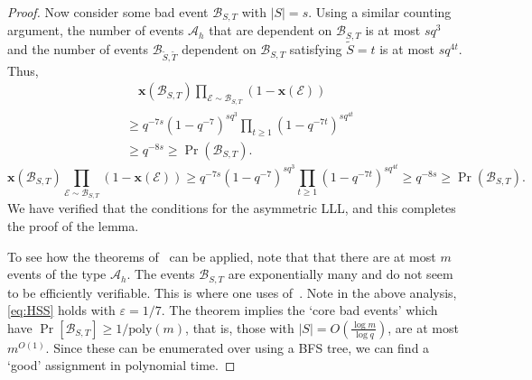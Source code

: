 \documentclass[11pt]{article}
\newcommand{\cardinal}[1]{\left|#1\right|}
\newcommand{\calA}{{\mathscr A}}
\newcommand{\calB}{{\mathscr B}}
\newcommand{\cA}{{\mathscr A}}
\newcommand{\cB}{\mathscr{B}}
\newcommand{\cE}{{\mathscr E}}
\newcommand{\eps}{\varepsilon}
\newcommand{\poly}{\mathrm{poly}}
\newcommand{\x}{{\mathbf x}}
\begin{document}
\begin{proof}
Now consider some bad event ${\calB}_{S, T}$ with $\cardinal{S} = s$. Using a similar counting argument, the number of events ${\calA}_h$ that are dependent on ${\calB}_{S, T}$ is at most $sq^3$ and the number of events ${\calB}_{\tilde S, \tilde T}$ dependent on ${\calB}_{S, T}$ satisfying $\tilde S = t$ is at most $sq^{4t}$.  Thus, 
\ifdefined\CR
\begin{align*}
&\quad \x\left({\calB}_{S, T}\right) \prod_{{\cE}\sim {\calB}_{S, T}}(1 - \x({\cE}))\\
&\geq q^{-7s} \left(1 - q^{-7}\right)^{sq^3}\prod_{t \geq 1}\left(1 - q^{-7t}\right)^{sq^{4t}}\\
& \geq q^{-8s} \geq \Pr({\calB}_{S, T}).
\end{align*}
\else
\[
\x\left({\calB}_{S, T}\right) \prod_{{\cE}\sim {\calB}_{S, T}}(1 - \x({\cE})) \geq q^{-7s} \left(1 - q^{-7}\right)^{sq^3}\prod_{t \geq 1}\left(1 - q^{-7t}\right)^{sq^{4t}} \geq q^{-8s} \geq \Pr({\calB}_{S, T}).
\]
\fi
We have verified that the conditions for the asymmetric LLL, and this completes the proof of the lemma.

To see how the theorems of~\cite{MT10,HSS11} can be applied, note that that there are at most $m$ events of the type $\cA_h$. The events $\cB_{S,T}$ are exponentially many and do not seem to be efficiently verifiable. 
This is where one uses  of~\cite{HSS11}. Note in the above analysis, \eqref{eq:HSS} holds with $\eps = 1/7$. The theorem implies the `core bad events' which have $\Pr[\cB_{S,T}] \geq 1/\poly(m)$, that is, those with  $|S| = O(\frac{\log m}{\log q})$, are at most $m^{O(1)}$. Since these can be enumerated over using a BFS tree, 
we can find a `good' assignment in polynomial time.
\end{proof}
\end{document}
